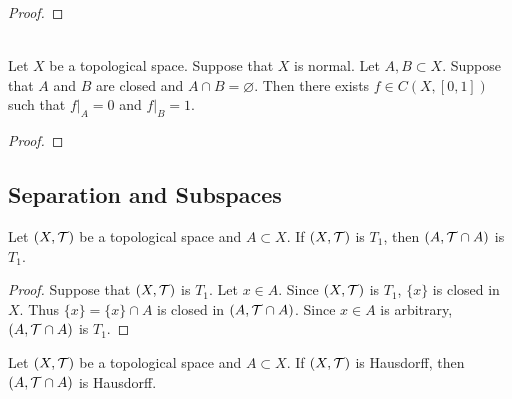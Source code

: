 \documentclass{book}
\begin{document}
	\begin{proof}
	\end{proof}

	\begin{ex}  \\
		Let $X$ be a topological space. Suppose that $X$ is normal. Let $A,B \subset X$. Suppose that $A$ and $B$ are closed and $A \cap B = \varnothing$. Then there exists $f \in C(X, [0,1])$ such that $f|_A = 0$ and $f|_B = 1$. 
	\end{ex}
	
	\begin{proof}
	\end{proof}






























	\subsection{Separation and Subspaces}
	
	\begin{ex} 
		Let $(X, \mathcal{T})$ be a topological space and $A \subset X$. If $(X, \mathcal{T})$ is $T_1$, then $(A, \mathcal{T} \cap A)$ is $T_1$.
	\end{ex}
	
	\begin{proof}
		Suppose that $(X, \mathcal{T})$ is $T_1$. Let $x \in A$. Since $(X, \mathcal{T})$ is $T_1$, $\{x\}$ is closed in $X$. Thus $\{x\} = \{x\} \cap A$ is closed in $(A, \mathcal{T} \cap A)$. Since $x \in A$ is arbitrary, $(A, \mathcal{T} \cap A)$ is $T_1$. 
	\end{proof}
	
	\begin{ex} 
		Let $(X, \mathcal{T})$ be a topological space and $A \subset X$. If $(X, \mathcal{T})$ is Hausdorff, then $(A, \mathcal{T} \cap A)$ is Hausdorff.
	\end{ex}
	
\end{document}

